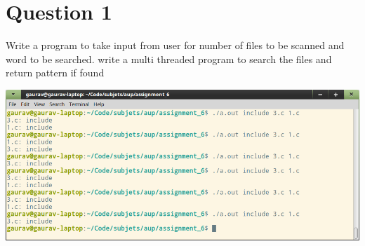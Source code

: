 \documentclass[main.tex]{subfiles}
\begin{document}
\section{Question 1}
Write a program to take input from user for number of files to be scanned and
word to be searched. write a multi threaded program to search the files and
return pattern if found


\includegraphics[width=\textwidth]{figures/1_output.png}
\end{document}
